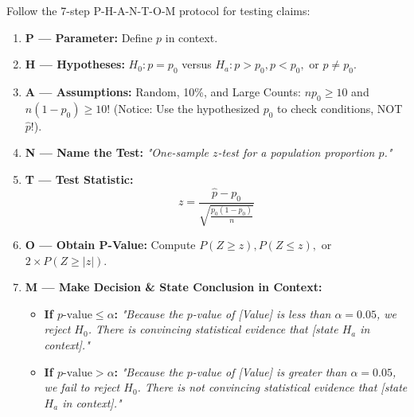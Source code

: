 \begin{lessonbox}
Follow the 7-step P-H-A-N-T-O-M protocol for testing claims:
\begin{enumerate}[leftmargin=1.5em]
  \item \textbf{P --- Parameter:} Define $p$ in context.
  \item \textbf{H --- Hypotheses:} $H_0: p = p_0$ versus $H_a: p > p_0, p < p_0,$ or $p \neq p_0$.
  \item \textbf{A --- Assumptions:} Random, 10\%, and Large Counts: $n p_0 \ge 10$ and $n(1-p_0) \ge 10$! (Notice: Use the hypothesized $p_0$ to check conditions, NOT $\hat{p}$!).
  \item \textbf{N --- Name the Test:} \textit{"One-sample $z$-test for a population proportion $p$."}
  \item \textbf{T --- Test Statistic:}
  \begin{equation}
    z = \frac{\hat{p} - p_0}{\sqrt{\frac{p_0(1-p_0)}{n}}}
  \end{equation}
  \item \textbf{O --- Obtain P-Value:} Compute $P(Z \ge z), P(Z \le z),$ or $2 \times P(Z \ge |z|)$.
  \item \textbf{M --- Make Decision \& State Conclusion in Context:}
  \begin{itemize}
    \item \textbf{If $p\text{-value} \le \alpha$:} \textit{"Because the $p$-value of [Value] is less than $\alpha = 0.05$, we reject $H_0$. There is convincing statistical evidence that [state $H_a$ in context]."}
    \item \textbf{If $p\text{-value} > \alpha$:} \textit{"Because the $p$-value of [Value] is greater than $\alpha = 0.05$, we fail to reject $H_0$. There is not convincing statistical evidence that [state $H_a$ in context]."}
  \end{itemize}
\end{enumerate}
\end{lessonbox}


